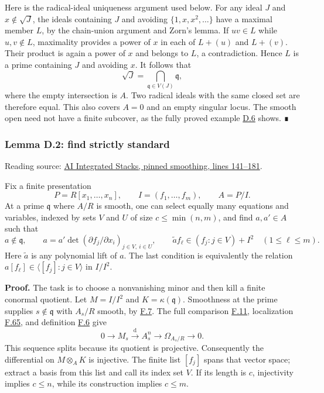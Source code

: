\documentclass[11pt,a4paper,openany]{report}
\begin{document}
Here is the radical-ideal uniqueness argument used below. For any ideal \(J\) and \(x\notin\sqrt J\), the ideals containing \(J\) and avoiding \(\{1,x,x^2,\ldots\}\) have a maximal member \(L\), by the chain-union argument and Zorn's lemma. If \(uv\in L\) while \(u,v\notin L\), maximality provides a power of \(x\) in each of \(L+(u)\) and \(L+(v)\). Their product is again a power of \(x\) and belongs to \(L\), a contradiction. Hence \(L\) is a prime containing \(J\) and avoiding \(x\). It follows that \[\sqrt J=\bigcap_{\mathfrak q\in V(J)}\mathfrak q,\] where the empty intersection is \(A\). Two radical ideals with the same closed set are therefore equal. This also covers \(A=0\) and an empty singular locus. The smooth open need not have a finite subcover, as the fully proved example \hyperref[AG-RG-S05-smoothing-example-not-quasi-compact]{D.6} shows. ∎

\label{AG-RG-S05-smoothing-lemma-find-strictly-standard}

\subsubsection{Lemma D.2: find strictly standard}\label{AG-RG-S05-lemma-d.2-find-strictly-standard}

Reading source: \href{https://github.com/KokunoYumeto/unofficial-stacks-project-ai-drafts/blob/565b10e987aba5969b21145a0833f42d69f96790/smoothing.tex\#L141-L181}{AI Integrated Stacks, pinned smoothing, lines 141--181}.

Fix a finite presentation \[P=R[x_1,\ldots,x_n],\qquad I=(f_1,\ldots,f_m),\qquad A=P/I.\] At a prime \(\mathfrak q\) where \(A/R\) is smooth, one can select equally many equations and variables, indexed by sets \(V\) and \(U\) of size \(c\leq\min(n,m)\), and find \(a,a'\in A\) such that \[a\notin\mathfrak q,\qquad
a=a'\det(\partial f_j/\partial x_i)_{j\in V,\ i\in U},\qquad
\widetilde a f_\ell\in(f_j:j\in V)+I^2\quad(1\leq\ell\leq m).\] Here \(\widetilde a\) is any polynomial lift of \(a\). The last condition is equivalently the relation \(a[f_\ell]\in\langle[f_j]:j\in V\rangle\) in \(I/I^2\).

\textbf{Proof.} The task is to choose a nonvanishing minor and then kill a finite conormal quotient. Let \(M=I/I^2\) and \(K=\kappa(\mathfrak q)\). Smoothness at the prime supplies \(s\notin\mathfrak q\) with \(A_s/R\) smooth, by \hyperref[AG-RG-S05-algebra-definition-smooth-at-prime]{F.7}. The full comparison \hyperref[AG-RG-S05-algebra-lemma-NL-homotopy]{F.11}, localization \hyperref[AG-RG-S05-algebra-lemma-localize-NL]{F.65}, and definition \hyperref[AG-RG-S05-algebra-definition-smooth]{F.6} give \[0\longrightarrow M_s\xrightarrow{\mathrm d}A_s^n
\longrightarrow\Omega_{A_s/R}\longrightarrow0.\] This sequence splits because its quotient is projective. Consequently the differential on \(M\otimes_A K\) is injective. The finite list \([f_j]\) spans that vector space; extract a basis from this list and call its index set \(V\). If its length is \(c\), injectivity implies \(c\leq n\), while its construction implies \(c\leq m\).
\end{document}
